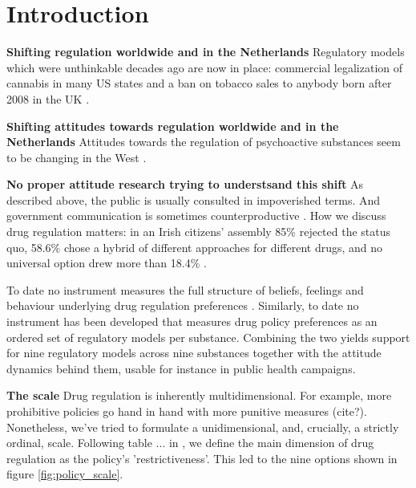 \documentclass[11pt,a4paper]{article}
\begin{document}


\section{Introduction}

\textbf{Shifting regulation worldwide and in the Netherlands} Regulatory models which were unthinkable decades ago are now in place: commercial legalization of cannabis in many US states and a ban on tobacco sales to anybody born after 2008 in the UK \parencite{tobaccovapesact2026}.

\textbf{Shifting attitudes towards regulation worldwide and in the Netherlands} Attitudes towards the regulation of psychoactive substances seem to be changing in the West \parencite{felson2019,gallup2023}. 

\textbf{No proper attitude research trying to understsand this shift} As described above, the public is usually consulted in impoverished terms. And government communication is sometimes counterproductive \parencite[e.g., messaging that presents drug use as normalised may increase use,][]{vanwingerde2023}. How we discuss drug regulation matters: in an Irish citizens' assembly 85\% rejected the status quo, 58.6\% chose a hybrid of different approaches for different drugs, and no universal option drew more than 18.4\% \parencite{citizensassembly2024}.

To date no instrument measures the full structure of beliefs, feelings and behaviour underlying drug regulation preferences \parencite[but see][]{greer2019,wilkins2022,hamrak2026}. Similarly, to date no instrument has been developed that measures drug policy preferences as an ordered set of regulatory models per substance. Combining the two yields support for nine regulatory models across nine substances together with the attitude dynamics behind them, usable for instance in public health campaigns.

\textbf{The scale} Drug regulation is inherently multidimensional. For example, more prohibitive policies go hand in hand with more punitive measures (cite?). Nonetheless, we've tried to formulate a unidimensional, and, crucially, a strictly ordinal, scale. Following table ... in \citet{maccoun2001}, we define the main dimension of drug regulation as the policy's 'restrictiveness'. This led to the nine options shown in figure \ref{fig:policy_scale}.
\end{document}

